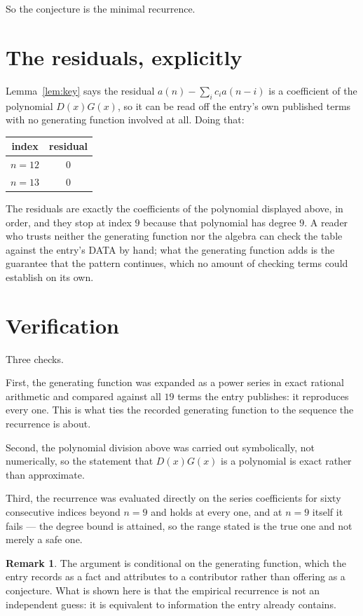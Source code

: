 \documentclass[11pt,a4paper]{article}
\theoremstyle{plain}
\theoremstyle{definition}
\newtheorem{remark}[theorem]{Remark}
\begin{document}
So the conjecture is the minimal recurrence.

\section{The residuals, explicitly}

Lemma~\ref{lem:key} says the residual $a(n)-\sum_ic_ia(n-i)$ is a coefficient of the
polynomial $D(x)G(x)$, so it can be read off the entry's own published terms with no
generating function involved at all. Doing that:
\begin{center}
\begin{tabular}{cc}
index & residual \\ \hline
$n=12$ & $0$ \\
$n=13$ & $0$
\end{tabular}
\end{center}
The residuals are exactly the coefficients of the polynomial displayed above, in order, and
they stop at index $9$ because that polynomial has degree $9$. A reader who trusts
neither the generating function nor the algebra can check the table against the entry's DATA
by hand; what the generating function adds is the guarantee that the pattern continues, which
no amount of checking terms could establish on its own.

\section{Verification}

Three checks.

First, the generating function was expanded as a power series in exact rational arithmetic and
compared against all $19$ terms the entry publishes: it reproduces every one. This is
what ties the recorded generating function to the sequence the recurrence is about.

Second, the polynomial division above was carried out symbolically, not numerically, so the
statement that $D(x)G(x)$ is a polynomial is exact rather than approximate.

Third, the recurrence was evaluated directly on the series coefficients for sixty consecutive
indices beyond $n=9$ and holds at every one, and at $n=9$ itself it fails --- the
degree bound is attained, so the range stated is the true one and not merely a safe one.

\begin{remark}
The argument is conditional on the generating function, which the entry records as a fact and
attributes to a contributor rather than offering as a conjecture. What is shown here is that
the empirical recurrence is not an independent guess: it is equivalent to information the
entry already contains.
\end{remark}
\end{document}
